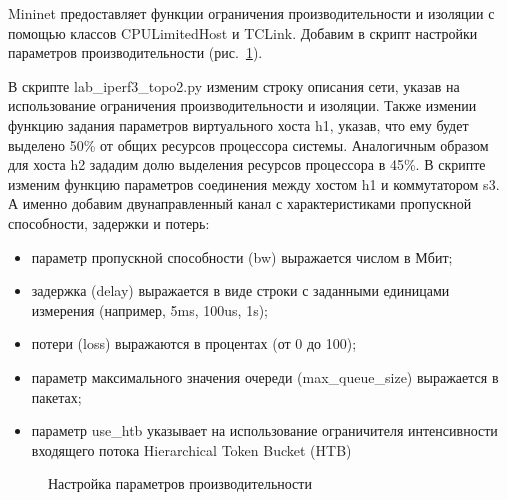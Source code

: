 \documentclass[
  english,
  russian,
  12pt,
  a4paper,
  DIV=11,
  numbers=noendperiod]{scrreprt}
\providecommand{\tightlist}{%
  \setlength{\itemsep}{0pt}\setlength{\parskip}{0pt}}
\begin{document}
Mininet предоставляет функции ограничения производительности и изоляции
с помощью классов CPULimitedHost и TCLink. Добавим в скрипт настройки
параметров производительности (рис.~\ref{fig-007}).

В скрипте lab\_iperf3\_topo2.py изменим строку описания сети, указав на
использование ограничения производительности и изоляции. Также измении
функцию задания параметров виртуального хоста h1, указав, что ему будет
выделено 50\% от общих ресурсов процессора системы. Аналогичным образом
для хоста h2 зададим долю выделения ресурсов процессора в 45\%. В
скрипте изменим функцию параметров соединения между хостом h1 и
коммутатором s3. А именно добавим двунаправленный канал с
характеристиками пропускной способности, задержки и потерь:

\begin{itemize}
\tightlist
\item
  параметр пропускной способности (bw) выражается числом в Мбит;
\item
  задержка (delay) выражается в виде строки с заданными единицами
  измерения (например, 5ms, 100us, 1s);
\item
  потери (loss) выражаются в процентах (от 0 до 100);
\item
  параметр максимального значения очереди (max\_queue\_size) выражается
  в пакетах;
\item
  параметр use\_htb указывает на использование ограничителя
  интенсивности входящего потока Hierarchical Token Bucket (HTB)
\end{itemize}

\begin{figure}


\caption{\label{fig-007}Настройка параметров производительности}

\end{figure}%
\end{document}
